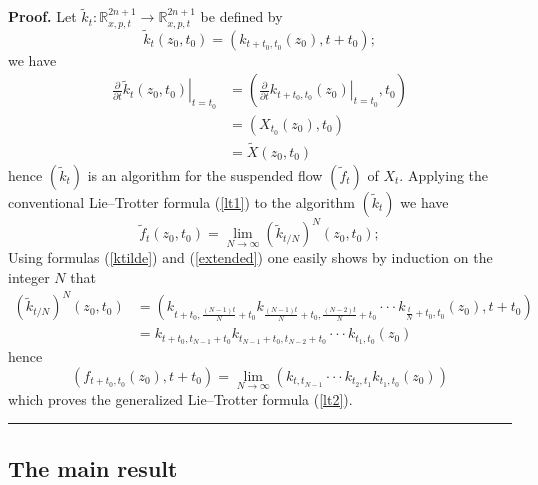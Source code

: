 \documentclass[12pt]{article}%
\newenvironment{proof}[1][Proof]{\noindent\textbf{#1.} }{\ \rule{0.5em}{0.5em}}
\begin{document}
\begin{proof}
Let $\widetilde{k}_{t}:\mathbb{R}_{x,p,t}^{2n+1}\longrightarrow\mathbb{R}%
_{x,p,t}^{2n+1}$ be defined by%
\begin{equation}
\widetilde{k}_{t}(z_{0},t_{0})=(k_{t+t_{0},t_{0}}(z_{0}),t+t_{0});
\label{ktilde}%
\end{equation}
we have
\begin{align*}
\left.  \frac{\partial}{\partial t}\widetilde{k}_{t}(z_{0},t_{0})\right\vert
_{t=t_{0}}  &  =\left(  \left.  \frac{\partial}{\partial t}k_{t+t_{0},t_{0}%
}(z_{0})\right\vert _{t=t_{0}},t_{0}\right) \\
&  =(X_{t_{0}}(z_{0}),t_{0})\\
&  =\widetilde{X}(z_{0},t_{0})
\end{align*}
hence $(\widetilde{k}_{t})$ is an algorithm for the suspended flow
$(\widetilde{f}_{t})$ of $X_{t}$. Applying the conventional Lie--Trotter
formula (\ref{lt1}) to the algorithm $(\widetilde{k}_{t})$ we have%
\[
\widetilde{f}_{t}(z_{0},t_{0})=\lim_{N\rightarrow\infty}(\widetilde{k}%
_{t/N})^{N}(z_{0},t_{0});
\]
Using formulas (\ref{ktilde}) and (\ref{extended}) one easily shows by
induction on the integer $N$ that
\begin{align*}
(\widetilde{k}_{t/N})^{N}(z_{0},t_{0})  &  =(k_{t+t_{0},\frac{(N-1)t}{N}%
+t_{0}}k_{\frac{(N-1)t}{N}+t_{0},\frac{(N-2)t}{N}+t_{0}}\cdot\cdot\cdot
k_{\frac{t}{N}+t_{0},t_{0}}(z_{0}),t+t_{0})\\
&  =k_{t+t_{0},t_{N-1}+t_{0}}k_{t_{N-1}+t_{0},t_{N-2}+t_{0}}\cdot\cdot\cdot
k_{t_{1},t_{0}}(z_{0})
\end{align*}
hence
\[
(f_{t+t_{0},t_{0}}(z_{0}),t+t_{0})=\lim_{N\rightarrow\infty}(k_{t,t_{N-1}%
}\cdot\cdot\cdot k_{t_{2},t_{1}}k_{t_{1},t_{0}}(z_{0}))
\]
which proves the generalized Lie--Trotter formula (\ref{lt2}).
\end{proof}

\subsection{The main result}
\end{document}
